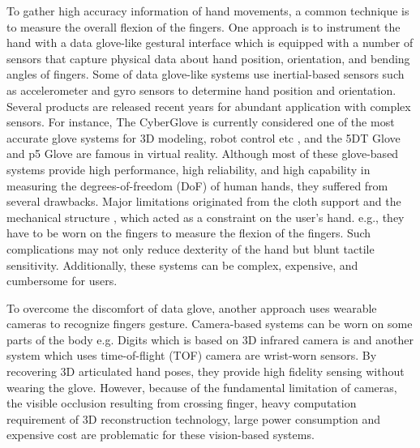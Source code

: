 \documentclass{sigchi}
\begin{document}


To gather high accuracy information of hand movements, a common technique is to measure the overall flexion of the fingers. One approach is to instrument the hand with a data glove-like gestural interface \cite{4539650} which is equipped with a number of sensors that capture physical data about hand position, orientation, and bending angles of fingers. Some of data glove-like systems use inertial-based sensors such as accelerometer and gyro sensors to determine hand position and orientation. Several products are released recent years for abundant application with complex sensors. For instance, The CyberGlove is currently considered one of the most accurate glove systems for 3D modeling, robot control etc \cite{LaViola:1999:SHP:864649} \cite{Burdea:2003:VRT:829566}, and the 5DT Glove and p5 Glove are famous in virtual reality. 
Although most of these glove-based systems provide high performance, high reliability, and high capability in measuring the degrees-of-freedom (DoF) of human hands, they suffered from several drawbacks.%
Major limitations originated from the cloth support and the mechanical structure%
, which acted as a constraint on the user’s hand. e.g., they have to be worn on the fingers to measure the flexion of the fingers. Such complications may not only reduce dexterity of the hand but blunt tactile sensitivity. Additionally, these systems can be complex, expensive, and cumbersome for users.

To overcome the discomfort of data glove, another approach uses wearable cameras to recognize fingers gesture. Camera-based systems can be worn on some parts of the body e.g. Digits \cite{Kim:2012:DFI:2380116.2380139} which is based on 3D infrared camera is and another system \cite{6855631} which uses time-of-flight (TOF) camera are wrist-worn sensors. By recovering 3D articulated hand poses, they provide high fidelity sensing without wearing the glove. However, because of the fundamental limitation of cameras, the visible occlusion resulting from crossing finger, heavy computation requirement of 3D reconstruction technology, large power consumption and expensive cost are problematic for these vision-based systems.
\end{document}
